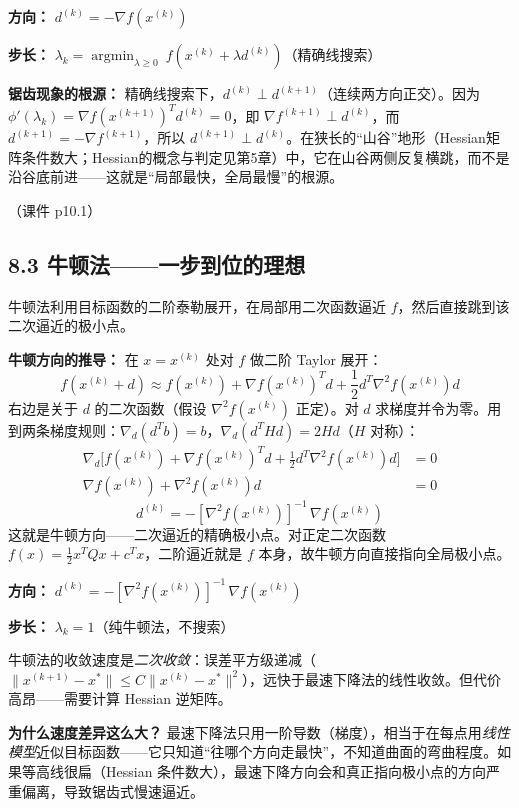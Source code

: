 \textbf{方向：} $d^{(k)} = -\nabla f(x^{(k)})$

\textbf{步长：} $\lambda_k = \displaystyle\operatorname*{argmin}_{\lambda \ge 0}\ f(x^{(k)} + \lambda d^{(k)})$（精确线搜索）

\textbf{锯齿现象的根源：} 精确线搜索下，$d^{(k)} \perp d^{(k+1)}$（连续两方向正交）。因为 $\phi'(\lambda_k) = \nabla f(x^{(k+1)})^T d^{(k)} = 0$，即 $\nabla f^{(k+1)} \perp d^{(k)}$，而 $d^{(k+1)} = -\nabla f^{(k+1)}$，所以 $d^{(k+1)} \perp d^{(k)}$。在狭长的“山谷”地形（Hessian矩阵条件数大；Hessian的概念与判定见第5章）中，它在山谷两侧反复横跳，而不是沿谷底前进——这就是“局部最快，全局最慢”的根源。

（课件 p10.1）

\subsection{8.3 牛顿法——一步到位的理想}

牛顿法利用目标函数的二阶泰勒展开，在局部用二次函数逼近 $f$，然后直接跳到该二次逼近的极小点。

\textbf{牛顿方向的推导：} 在 $x=x^{(k)}$ 处对 $f$ 做二阶 Taylor 展开：
\[
f(x^{(k)}+d) \approx f(x^{(k)}) + \nabla f(x^{(k)})^T d + \frac{1}{2} d^T \nabla^2 f(x^{(k)}) d
\]
右边是关于 $d$ 的二次函数（假设 $\nabla^2 f(x^{(k)})$ 正定）。对 $d$ 求梯度并令为零。用到两条梯度规则：$\nabla_d(d^T b)=b$，$\nabla_d(d^T H d)=2Hd$（$H$ 对称）：
\begin{align*}
\nabla_d\bigl[f(x^{(k)}) + \nabla f(x^{(k)})^T d + \tfrac12 d^T \nabla^2 f(x^{(k)}) d\bigr] &= 0 \\
\nabla f(x^{(k)}) + \nabla^2 f(x^{(k)}) d &= 0
\end{align*}
\[
\boxed{d^{(k)} = -[\nabla^2 f(x^{(k)})]^{-1}\, \nabla f(x^{(k)})}
\]
这就是牛顿方向——二次逼近的精确极小点。对正定二次函数 $f(x)=\frac12 x^T Q x + c^T x$，二阶逼近就是 $f$ 本身，故牛顿方向直接指向全局极小点。

\textbf{方向：} $d^{(k)} = -[\nabla^2 f(x^{(k)})]^{-1}\, \nabla f(x^{(k)})$

\textbf{步长：} $\lambda_k = 1$（纯牛顿法，不搜索）

牛顿法的收敛速度是\emph{二次收敛}：误差平方级递减（$\|x^{(k+1)}-x^*\| \le C\|x^{(k)}-x^*\|^2$），远快于最速下降法的线性收敛。但代价高昂——需要计算 Hessian 逆矩阵。

\textbf{为什么速度差异这么大？} 最速下降法只用一阶导数（梯度），相当于在每点用\emph{线性模型}近似目标函数——它只知道“往哪个方向走最快”，不知道曲面的弯曲程度。如果等高线很扁（Hessian 条件数大），最速下降方向会和真正指向极小点的方向严重偏离，导致锯齿式慢速逼近。

